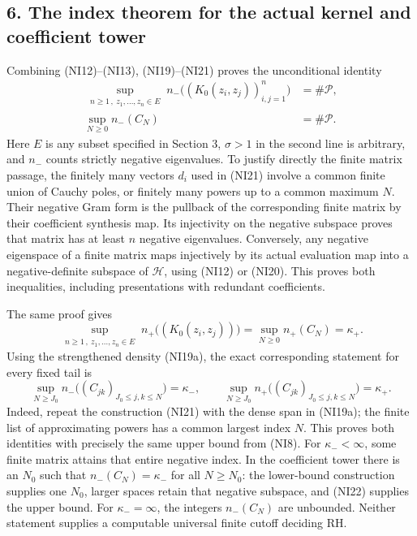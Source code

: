 \documentclass[
  10pt,
  a4paper,
]{article}
\begin{document}
\subsection{6. The index theorem for the actual kernel and coefficient
tower}\label{the-index-theorem-for-the-actual-kernel-and-coefficient-tower}

Combining (NI12)--(NI13), (NI19)--(NI21) proves the unconditional
identity \[
\boxed{
\begin{split}
\sup_{\substack{n\ge1\,,\ z_1,\ldots,z_n\in E}}
n_-\bigl((K_0(z_i,z_j))_{i,j=1}^n\bigr)
&=\#\mathcal P,\\
\sup_{N\ge0} n_-(C_N)&=\#\mathcal P.
\end{split}}
\tag{NI22}
\] Here \(E\) is any subset specified in Section 3, \(\sigma>1\) in the
second line is arbitrary, and \(n_-\) counts strictly negative
eigenvalues. To justify directly the finite matrix passage, the finitely
many vectors \(d_i\) used in (NI21) involve a common finite union of
Cauchy poles, or finitely many powers up to a common maximum \(N\).
Their negative Gram form is the pullback of the corresponding finite
matrix by their coefficient synthesis map. Its injectivity on the
negative subspace proves that matrix has at least \(n\) negative
eigenvalues. Conversely, any negative eigenspace of a finite matrix maps
injectively by its actual evaluation map into a negative-definite
subspace of \(\mathcal H\), using (NI12) or (NI20). This proves both
inequalities, including presentations with redundant coefficients.

The same proof gives \[
\sup_{\substack{n\ge1\,,\ z_1,\ldots,z_n\in E}}
n_+\bigl((K_0(z_i,z_j))\bigr)
=\sup_{N\ge0}n_+(C_N)=\kappa_+.
\tag{NI23}
\] Using the strengthened density (NI19a), the exact corresponding
statement for every fixed tail is \[
\sup_{N\ge J_0}n_-\bigl((C_{jk})_{J_0\le j,k\le N}\bigr)=\kappa_-,
\qquad
\sup_{N\ge J_0}n_+\bigl((C_{jk})_{J_0\le j,k\le N}\bigr)=\kappa_+.
\tag{NI23a}
\] Indeed, repeat the construction (NI21) with the dense span in
(NI19a); the finite list of approximating powers has a common largest
index \(N\). This proves both identities with precisely the same upper
bound from (NI8). For \(\kappa_-<\infty\), some finite matrix attains
that entire negative index. In the coefficient tower there is an \(N_0\)
such that \(n_-(C_N)=\kappa_-\) for all \(N\ge N_0\): the lower-bound
construction supplies one \(N_0\), larger spaces retain that negative
subspace, and (NI22) supplies the upper bound. For \(\kappa_-=\infty\),
the integers \(n_-(C_N)\) are unbounded. Neither statement supplies a
computable universal finite cutoff deciding RH.
\end{document}
